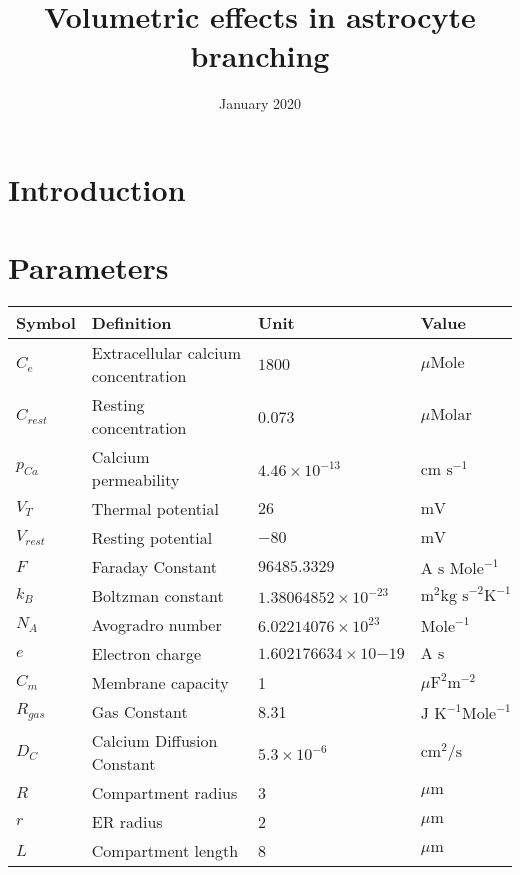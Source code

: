 \documentclass{article}
\title{Volumetric effects in astrocyte branching}
\author{ }
\date{January 2020}
\begin{document}
\maketitle
\newcommand{\trm}{\textrm}

\section{Introduction}

\section{Parameters}
\begin{center}
\begin{tabular}{|l|l|l|l|} 
\hline
Symbol & Definition & Unit & Value \\
\hline
$C_e$ & Extracellular calcium concentration & $1800$ & ${\mu\trm{Mole}}$ \\
$C_{rest}$ & Resting concentration & 0.073 & $\mu\trm{Molar}$ \\
$p_{Ca}$ & Calcium permeability & $4.46\times 10^{-13}$ & $\trm{cm s}^{-1}$  \\
$V_T$ & Thermal potential& $26$& $\trm{mV}$ \\
$V_{rest}$& Resting potential & $-80$ & $\trm{mV}$ \\
$F$ & Faraday Constant &$96485.3329$ &$\trm{A s Mole}^{-1}$   \\
$k_B$ & Boltzman constant&$1.38064852\times 10^{-23}$ & $\trm{m}^2 \trm{kg s}^{-2} \trm{K}^{-1}$ \\
$N_A$ & Avogradro number& $6.02214076 \times 10^{23}$& $\trm{Mole}^{-1}$ \\
$e$ & Electron charge& $1.602176634\times 10{-19}$& $\trm{A s}$ \\
$C_m$ & Membrane capacity& 1 &$\mu\trm{F}^2 \trm{m}^{-2}$  \\
$R_{gas}$ & Gas Constant& 8.31 & $\trm{J K}^{-1} \trm{Mole}^{-1}$\\
$D_C$ & Calcium Diffusion Constant& $5.3 \times 10^{-6}$ & $\trm{cm}^2/\trm{s}$ \\   %
$R$ & Compartment radius & 3 & $\mu\trm{m}$  \\
$r$ & ER radius & 2 & $\mu\trm{m}$  \\
$L$ & Compartment length& 8 & $\mu\trm{m}$  \\

\end{tabular}
\end{center}
\end{document}
